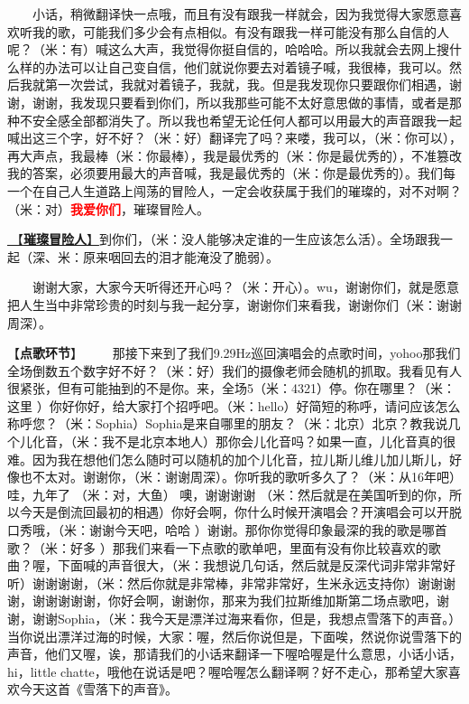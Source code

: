 \documentclass[]{ctexbook}
\begin{document}
  小话，稍微翻译快一点哦，而且有没有跟我一样就会，因为我觉得大家愿意喜欢听我的歌，可能我们多少会有点相似。有没有跟我一样可能没有那么自信的人呢？（米：有）喊这么大声，我觉得你挺自信的，哈哈哈。所以我就会去网上搜什么样的办法可以让自己变自信，他们就说你要去对着镜子喊，我很棒，我可以。然后我就第一次尝试，我就对着镜子，我就，我。但是我发现你只要跟你们相遇，谢谢，谢谢，我发现只要看到你们，所以我那些可能不太好意思做的事情，或者是那种不安全感全部都消失了。所以我也希望无论任何人都可以用最大的声音跟我一起喊出这三个字，好不好？（米：好）翻译完了吗？来喽，我可以，（米：你可以），再大声点，我最棒（米：你最棒），我是最优秀的（米：你是最优秀的），不准篡改我的答案，必须要用最大的声音喊，我是最优秀的（米：你是最优秀的）。我们每一个在自己人生道路上闯荡的冒险人，一定会收获属于我们的璀璨的，对不对啊？（米：对）\textbf{\textcolor{red}{我爱你们}}，璀璨冒险人。

\hyperref[adventurers]{🎵【\textbf{璀璨冒险人}】}到你们，（米：没人能够决定谁的一生应该怎么活）。全场跟我一起（深、米：原来咽回去的泪才能淹没了脆弱）。

  谢谢大家，大家今天听得还开心吗？（米：开心）。wu，谢谢你们，就是愿意把人生当中非常珍贵的时刻与我一起分享，谢谢你们来看我，谢谢你们（米：谢谢周深）。

【\textbf{点歌环节}】
  那接下来到了我们9.29Hz巡回演唱会的点歌时间，yohoo那我们全场倒数五个数字好不好？（米：好）我们的摄像老师会随机的抓取。我看见有人很紧张，但有可能抽到的不是你。来，全场5（米：4321）停。你在哪里？（米：这里 ）你好你好，给大家打个招呼吧。（米：hello）好简短的称呼，请问应该怎么称呼您？（米：Sophia）Sophia是来自哪里的朋友？（米：北京）北京？教我说几个儿化音，（米：我不是北京本地人）那你会儿化音吗？如果一直，儿化音真的很难。因为我在想他们怎么随时可以随机的加个儿化音，拉儿斯儿维儿加儿斯儿，好像也不太对。谢谢你，（米：谢谢周深）。你听我的歌听多久了？（米：从16年吧） 哇，九年了 （米：对，大鱼） 噢，谢谢谢谢 （米：然后就是在美国听到的你，所以今天是倒流回最初的相遇）你好会啊，你什么时候开演唱会？开演唱会可以开脱口秀哦，（米：谢谢今天吧，哈哈 ）谢谢。那你你觉得印象最深的我的歌是哪首歌？（米：好多 ）那我们来看一下点歌的歌单吧，里面有没有你比较喜欢的歌曲？喔，下面喊的声音很大，（米：我想说几句话，然后就是反深代词非常非常好听）谢谢谢谢，（米：然后你就是非常棒，非常非常好，生米永远支持你）谢谢谢谢，谢谢谢谢谢，你好会啊，谢谢你，那来为我们拉斯维加斯第二场点歌吧，谢谢，谢谢Sophia，（米：我今天是漂洋过海来看你，但是，我想点雪落下的声音。）当你说出漂洋过海的时候，大家：喔，然后你说但是，下面唉，然说你说雪落下的声音，他们又喔，诶，那请我们的小话来翻译一下喔哈喔是什么意思，小话小话，hi，little chatte，哦他在说话是吧？喔哈喔怎么翻译啊？好不走心，那希望大家喜欢今天这首《雪落下的声音》。
\end{document}
